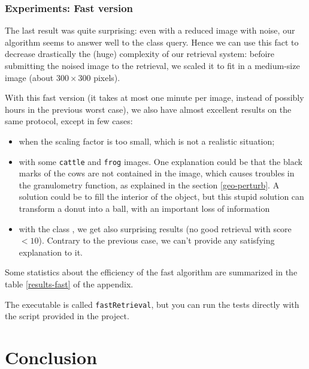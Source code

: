 \subsubsection{Experiments: Fast version}

The last result was quite surprising: even with a reduced image with noise, our algorithm seems to answer well to the class query. Hence we can use this fact to decrease drastically the (huge) complexity of our retrieval system: befoire submitting the noised image to the retrieval, we scaled it to fit in a medium-size image (about $300\times300$ pixels).

With this fast version (it takes at most one minute per image, instead of possibly hours in the previous worst case), we also have almost excellent results on the same protocol, except in few cases:
\begin{itemize}
 \item when the scaling factor is too small, which is not a realistic situation;
 \item with some \texttt{cattle} and \texttt{frog} images. One explanation could be that the black marks of the cows are not contained in the image, which causes troubles in the granulometry function, as explained in the section \ref{geo-perturb}. A solution could be to fill the interior of the object, but this stupid solution can transform a donut into a ball, with an important loss of information
 \item with the class , we get also surprising results (no good retrieval with score $< 10$). Contrary to the previous case, we can't provide any satisfying explanation to it.
\end{itemize}

Some statistics about the efficiency of the fast algorithm are summarized in the table \ref{results-fast} of the appendix.

The executable is called \texttt{fastRetrieval}, but you can run the tests directly with the script provided in the project.


\section*{Conclusion}


